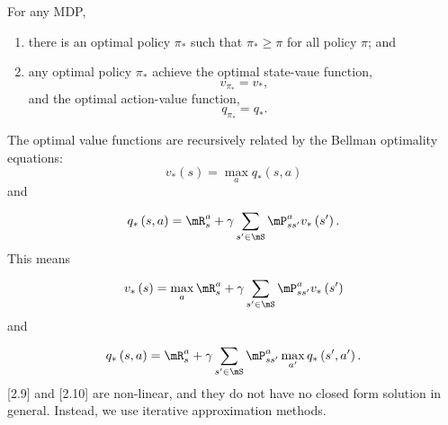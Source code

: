 \documentclass[RL]{subfiles}
\begin{document}
    \begin{theorem}{}
        For any MDP,
        \begin{enumerate}
            \item there is an optimal policy $\pi_{*}$ such that $\pi_{*}\geq \pi$ for all policy $\pi$; and
            \item any optimal policy $\pi_*$ achieve the optimal state-vaue function, 
                \begin{equation*}
                    v_{\pi_*} = v_*,
                \end{equation*}
                and the optimal action-value function,
                \begin{equation*}
                    q_{\pi_*} = q_*.
                \end{equation*}
        \end{enumerate}
    \end{theorem}

    \rruleline

    \np The optimal value functions are recursively related by the Bellman optimality equations:
    \begin{equation}
        v_*\left( s \right) = \max_{a} q_*\left( s,a \right)
    \end{equation}
    and
    \begin{equation}
        q_*\left( s,a \right) = \mR^a_s + \gamma\sum^{}_{s'\in\mS}\mP^a_{ss'}v_*\left( s' \right).
    \end{equation}
    This means
    \begin{equation}
        v_*\left( s \right) = \max_a \mR^a_s + \gamma\sum^{}_{s'\in\mS}\mP^a_{ss'}v_*\left( s' \right)
    \end{equation}
    and
    \begin{equation}
        q_*\left( s,a \right) = \mR^a_s + \gamma\sum^{}_{s'\in\mS} \mP^a_{ss'} \max_{a'}q_*\left( s',a' \right).
    \end{equation}
    [2.9] and [2.10] are non-linear, and they do not have no closed form solution in general. Instead, we use iterative approximation methods.





























    
    
    
    
    
    
    
    
    
    
\end{document}
